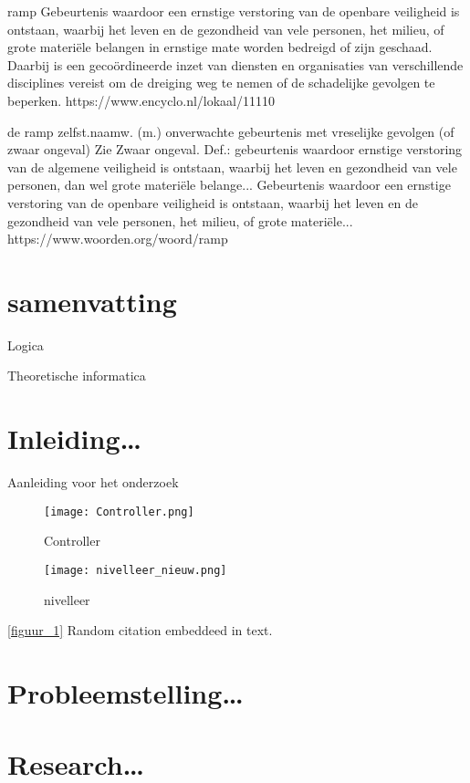 \documentclass[a4paper,12pt]{article}
\begin{document}
\begin{multicols}{2}
ramp
Gebeurtenis waardoor een ernstige verstoring van de openbare veiligheid is ontstaan, waarbij het leven en de gezondheid van vele personen, het milieu, of grote materiële belangen in ernstige mate worden bedreigd of zijn geschaad. Daarbij is een gecoördineerde inzet van diensten en organisaties van verschillende disciplines vereist om de dreiging weg te nemen of de schadelijke gevolgen te beperken.
https://www.encyclo.nl/lokaal/11110


de ramp zelfst.naamw. (m.)
onverwachte gebeurtenis met vreselijke gevolgen
(of zwaar ongeval) Zie Zwaar ongeval.
Def.: gebeurtenis waardoor ernstige verstoring van de algemene veiligheid is ontstaan, waarbij het leven en gezondheid van vele personen, dan wel grote materiële belange...
Gebeurtenis waardoor een ernstige verstoring van de openbare veiligheid is ontstaan, waarbij het leven en de gezondheid van vele personen, het milieu, of grote materiële...	
https://www.woorden.org/woord/ramp

\end{multicols}
 



\section{samenvatting}

Logica

Theoretische informatica



\section{Inleiding\dots}
Aanleiding voor het onderzoek
\begin{figure}
    \centering
    \texttt{[image: Controller.png]}
    \caption{Controller}
    \label{fig:figuur_1}
\end{figure}

\begin{figure}
    \centering
    \texttt{[image: nivelleer\_nieuw.png]}
    \caption{nivelleer}
    \label{fig:figuur_2}
\end{figure}

\ref{figuur_1}
Random citation \cite{Nobody06} embeddeed in text.
\section{Probleemstelling\dots}
\section{Research\dots}
\end{document}
